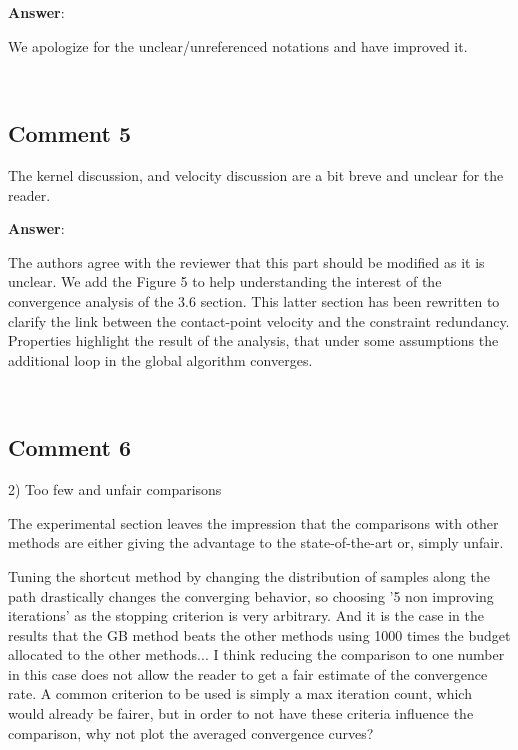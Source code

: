 \documentclass{scrartcl}
\begin{document}
\vspace{0.5cm}

\textbf{Answer}:

We apologize for the unclear/unreferenced notations and have improved it.

\noindent
\hrulefill\\

\subsection{Comment 5}

The kernel discussion, and velocity discussion are a bit breve and unclear for the reader.

\vspace{0.5cm}

\textbf{Answer}:

The authors agree with the reviewer that this part should be modified as it is unclear. We add the Figure 5 to help understanding the interest of the convergence analysis of the 3.6 section. This latter section has been rewritten to clarify the link between the contact-point velocity and the constraint redundancy. Properties highlight the result of the analysis, that under some assumptions the additional loop in the global algorithm converges.

\noindent
\hrulefill\\

\subsection{Comment 6}

2) Too few and unfair comparisons

The experimental section leaves the impression that the comparisons with other methods are either giving the advantage to the state-of-the-art or, simply unfair. 

Tuning the shortcut method by changing the distribution of samples along the path drastically changes the converging behavior, so choosing '5 non improving iterations' as the stopping criterion is very arbitrary. And it is the case in the results that the GB method beats the other methods using 1000 times the budget allocated to the other methods... I think reducing the comparison to one number in this case does not allow the reader to get a fair estimate of the convergence rate. A common criterion to be used is simply a max iteration count, which would already be fairer, but in order to not have these criteria influence the comparison, why not plot the averaged convergence curves?
\end{document}
